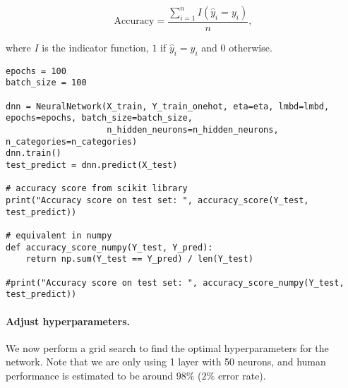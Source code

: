 $$ \text{Accuracy} = \frac{\sum_{i=1}^n I(\hat{y}_i = y_i)}{n} ,$$  

where $I$ is the indicator function, $1$ if $\hat{y}_i = y_i$ and $0$ otherwise.


















\begin{verbatim}
epochs = 100
batch_size = 100

dnn = NeuralNetwork(X_train, Y_train_onehot, eta=eta, lmbd=lmbd, epochs=epochs, batch_size=batch_size,
                    n_hidden_neurons=n_hidden_neurons, n_categories=n_categories)
dnn.train()
test_predict = dnn.predict(X_test)

# accuracy score from scikit library
print("Accuracy score on test set: ", accuracy_score(Y_test, test_predict))

# equivalent in numpy
def accuracy_score_numpy(Y_test, Y_pred):
    return np.sum(Y_test == Y_pred) / len(Y_test)

#print("Accuracy score on test set: ", accuracy_score_numpy(Y_test, test_predict))

\end{verbatim}


\paragraph{Adjust hyperparameters.}
We now perform a grid search to find the optimal hyperparameters for the network.  
Note that we are only using 1 layer with 50 neurons, and human performance is estimated to be around $98\%$ ($2\%$ error rate).






















